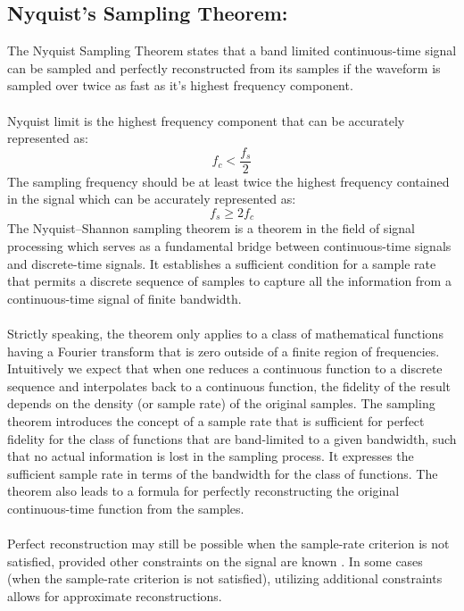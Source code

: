 \documentclass[12pt,a4paper]{article}
\begin{document}
\subsection{Nyquist’s Sampling Theorem:}
The Nyquist Sampling Theorem states that a band limited continuous-time signal can be sampled and perfectly reconstructed from its samples if the waveform is sampled over twice as fast as it's highest frequency component. \\
\\Nyquist limit is the highest frequency component that can be accurately represented as:
\begin{equation}
    \text{$f_{c}$} < \frac{\text{$f_s$}}{2}
\end{equation}
The sampling frequency should be at least twice the highest frequency contained in the signal which can be accurately represented as:
\begin{equation}
    \text{$f_{s}$} \geq \text{$2f_c$}
\end{equation}
The Nyquist–Shannon sampling theorem is a theorem in the field of signal processing which serves as a fundamental bridge between continuous-time signals and discrete-time signals. It establishes a sufficient condition for a sample rate that permits a discrete sequence of samples to capture all the information from a continuous-time signal of finite bandwidth.\\
\\Strictly speaking, the theorem only applies to a class of mathematical functions having a Fourier transform that is zero outside of a finite region of frequencies. Intuitively we expect that when one reduces a continuous function to a discrete sequence and interpolates back to a continuous function, the fidelity of the result depends on the density (or sample rate) of the original samples. The sampling theorem introduces the concept of a sample rate that is sufficient for perfect fidelity for the class of functions that are band-limited to a given bandwidth, such that no actual information is lost in the sampling process. It expresses the sufficient sample rate in terms of the bandwidth for the class of functions. The theorem also leads to a formula for perfectly reconstructing the original continuous-time function from the samples.\\
\\Perfect reconstruction may still be possible when the sample-rate criterion is not satisfied, provided other constraints on the signal are known . In some cases (when the sample-rate criterion is not satisfied), utilizing additional constraints allows for approximate reconstructions.
\end{document}
